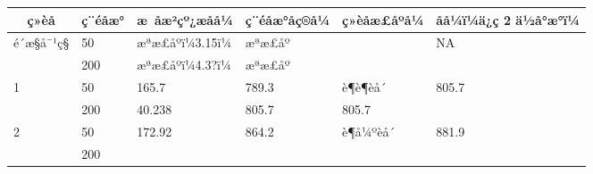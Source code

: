 \documentclass[UTF8,10pt,a4paper,fontset=fandol]{ctexart}
\newcommand{\handwritten}[1]{#1}
\begin{document}
\small
\begin{tabular}{|p{}|p{}|p{}|p{}|p{}|p{}|}
\hline
\multicolumn{1}{|c|}{ç»èå­} &
\multicolumn{1}{c|}{ç¨éåæ°} &
\multicolumn{1}{c|}{æ åæ²çº¿æåå¼} &
\multicolumn{1}{c|}{ç¨éåæ°åç®å¼} &
\multicolumn{1}{c|}{ç»èå­æ£åºå¼} &
\multicolumn{1}{c|}{åå¼ï¼ä¿ç 2 ä½å°æ°ï¼}
\\ \hline
\multirow{2}{*}{é´æ§å¯¹ç§}
&
\handwritten{50}
&
\handwritten{æªæ£åºï¼3.15ï¼}
&
\handwritten{æªæ£åº}
&
&
NA
\\ \cline{2-6}
&
\handwritten{200}
&
\handwritten{æªæ£åºï¼4.3?ï¼}
&
\handwritten{æªæ£åº}
&
&
\\ \hline
\multirow{2}{*}{1}
&
\handwritten{50}
&
\handwritten{165.7}
&
\handwritten{789.3}
&
\handwritten{è¶è¶èå´}
&
\handwritten{805.7}
\\ \cline{2-6}
&
\handwritten{200}
&
\handwritten{40.238}
&
\handwritten{805.7}
&
\handwritten{805.7}
&
\\ \hline
\multirow{2}{*}{2}
&
\handwritten{50}
&
\handwritten{172.92}
&
\handwritten{864.2}
&
\handwritten{è¶å¼ºèå´}
&
\handwritten{881.9}
\\ \cline{2-6}
&
\handwritten{200}
&

\end{tabular}
\end{document}
